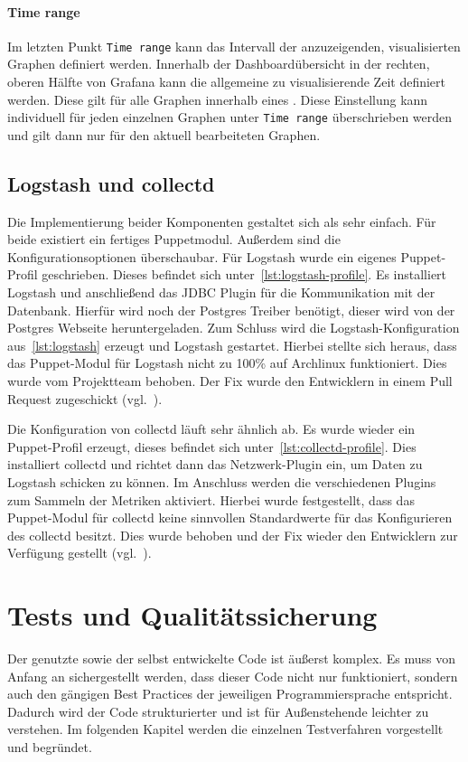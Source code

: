 \subsubsection{Time range}
Im letzten Punkt \texttt{Time range} kann das Intervall der anzuzeigenden,
visualisierten Graphen definiert werden. Innerhalb der Dashboardübersicht in
der rechten, oberen Hälfte von Grafana kann die allgemeine zu visualisierende
Zeit definiert werden. Diese gilt für alle Graphen innerhalb eines
. Diese Einstellung kann individuell für jeden
einzelnen Graphen unter \texttt{Time range} überschrieben werden und gilt dann
nur für den aktuell bearbeiteten Graphen.
\mr%

\section{Logstash und collectd}
Die Implementierung beider Komponenten gestaltet sich als sehr einfach. Für
beide existiert ein fertiges Puppetmodul. Außerdem sind die
Konfigurationsoptionen überschaubar. Für Logstash wurde ein eigenes
Puppet\hyp{}Profil geschrieben. Dieses befindet sich
unter~\ref{lst:logstash-profile}. Es installiert Logstash und anschließend das
\gls{JDBC} Plugin für die Kommunikation mit der Datenbank. Hierfür wird noch
der Postgres \gls{Treiber} benötigt, dieser wird von der Postgres Webseite
heruntergeladen. Zum Schluss wird die Logstash\hyp{}Konfiguration
aus~\ref{lst:logstash} erzeugt und Logstash gestartet. Hierbei stellte sich
heraus, dass das Puppet\hyp{}Modul für Logstash nicht zu 100\% auf Archlinux
funktioniert. Dies wurde vom Projektteam behoben. Der Fix wurde den
Entwicklern in einem Pull Request zugeschickt (vgl.~\cite{logstash-bug}).

Die Konfiguration von collectd läuft sehr ähnlich ab. Es wurde wieder ein
Puppet\hyp{}Profil erzeugt, dieses befindet sich
unter~\ref{lst:collectd-profile}. Dies installiert collectd und richtet dann
das Netzwerk\hyp{}Plugin ein, um Daten zu Logstash schicken zu können. Im
Anschluss werden die verschiedenen Plugins zum Sammeln der Metriken aktiviert.
Hierbei wurde festgestellt, dass das Puppet\hyp{}Modul für collectd keine
sinnvollen Standardwerte für das Konfigurieren des collectd
 besitzt. Dies wurde behoben und der Fix
wieder den Entwicklern zur Verfügung gestellt (vgl.~\cite{collectd-bug}).
\tm%

\chapter{Tests und Qualitätssicherung}
Der genutzte sowie der selbst entwickelte Code ist äußerst komplex. Es muss von
Anfang an sichergestellt werden, dass dieser Code nicht nur funktioniert,
sondern auch den gängigen Best Practices der jeweiligen Programmiersprache
entspricht. Dadurch wird der Code strukturierter und ist für Außenstehende
leichter zu verstehen. Im folgenden Kapitel werden die einzelnen Testverfahren
vorgestellt und begründet.
\tm%

